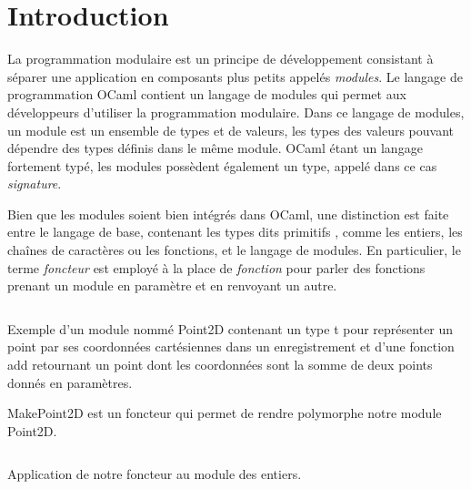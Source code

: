 \chapter*{Introduction}

La programmation modulaire est un principe de développement consistant à séparer une
application en composants plus petits appelés \textit{modules}. Le langage de
programmation OCaml contient un langage de modules qui permet aux développeurs
d'utiliser la programmation modulaire. Dans ce langage de modules, un module est
un ensemble de types et de valeurs, les types des valeurs pouvant dépendre des
types définis dans le même module.
OCaml étant un langage fortement typé, les modules possèdent également
un type, appelé dans ce cas \textit{signature}.


Bien que les modules soient bien intégrés dans OCaml, une
distinction est faite entre le langage de base, contenant les types dits
\og primitifs \fg, comme les entiers, les chaînes de caractères ou les fonctions, et le
langage de modules. En particulier, le terme \textit{foncteur} est employé à la
place de \textit{fonction} pour parler des fonctions prenant un module en
paramètre et en renvoyant un autre.

\renewcommand\listingscaption{Code OCaml}

\begin{listing}
  \inputminted{OCaml}{codes/intro_point2D.ml}
  \caption{Exemple d'un module nommé Point2D contenant un type t pour
    représenter un point par ses coordonnées cartésiennes dans un enregistrement
    et d'une fonction add retournant un point dont les coordonnées sont
    la somme de deux points donnés en paramètres.}
\end{listing}

\begin{listing}
  \caption{MakePoint2D est un foncteur qui permet de rendre polymorphe notre
    module Point2D.}
  \inputminted{OCaml}{codes/intro_point2D_polymorphic.ml}
\end{listing}

\begin{listing}
  \caption{Application de notre foncteur au module des entiers.}
  \inputminted{OCaml}{codes/intro_point2D_polymorphic_app.ml}
\end{listing}

